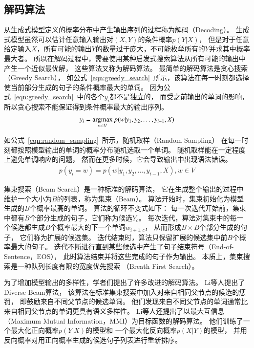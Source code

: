\subsection{解码算法}\label{subsec:decode}
从生成式模型定义的概率分布中产生输出序列的过程称为解码（Decoding）。
生成式模型虽然可以估计任意输入输出对$(X, Y)$的条件概率$p(Y|X)$，
但是对于任意给定输入$X$，所有可能的输出$Y$的数量过于庞大，不可能枚举所有的$Y$并求其中概率最大者。
所以在解码过程中，需要使用某种启发式搜索算法从所有可能的输出中产生一个近似最优解，
这些算法又称为解码算法。
最简单的解码算法是贪心搜索（Greedy Search），
如公式~\ref{eqn:greedy_search}~所示，该算法在每一时刻都选择使当前部分生成的句子的条件概率最大的单词。
因为公式~\ref{eqn:greedy_search}~中的各个$y_i$都不是独立的，
而受之前输出的单词的影响，所以贪心搜索不能保证得到条件概率最大的输出序列。
\begin{align}
    y_i = \operatorname*{argmax}_{w \in V} p(w|y_1, y_2, \dots, y_{i-1}, X)
    \label{eqn:greedy_search}
\end{align}

如公式~\ref{eqn:random_sampling}~所示，随机取样（Random Sampling）
在每一时刻都按照模型输出的单词的概率分布随机选取一个单词。
随机取样能在一定程度上避免单调响应的问题，
然而在更多时候，它会导致输出中出现语法错误。
\begin{align}
    p(y_i = w) = p(w|y_1, y_2, \dots, y_{i-1}, X), w \in V
    \label{eqn:random_sampling}
\end{align}

集束搜索（Beam Search）是一种标准的解码算法，
它在生成整个输出的过程中维护一个大小为$B$的列表，称为集束（Beam）。
算法开始时，集束初始化为模型生成的$B$个概率最高的单词。
算法的循环不变式如下：
每一次迭代开始前，集束中都有$B$个部分生成的句子，它们称为候选$Y_c$。
每次迭代，算法对集束中的每一个候选都生成$B$个概率最大的下一个单词$w_{i+1, c}$，
从而形成$B \times B$个部分生成的句子，
它们称为扩展的候选集。
迭代结束时，算法只保留扩展的候选集中前$B$个概率最大的句子。
迭代不断进行直到某些候选中产生了句子结束符号（End-of-Sentence，EOS），
此时算法结束并将这些完成的句子作为输出。
本质上，集束搜索是一种队列长度有限的宽度优先搜索
（Breath First Search）。

为了增加模型输出的多样性，学者们提出了许多改进的解码算法。
Li等人提出了Diverse Beam算法，
该算法在标准集束搜索中加入对来自相同父节点的候选的惩罚，
即鼓励来自不同父节点的候选单词。
他们发现来自不同父节点的单词通常比来自相同父节点的单词更具有语义多样性。
Li等人还提出了以最大互信息（Maximum Mutual Information，MMI）为目标函数的解码算法。
他们训练了一个最大化正向概率$p(Y|X)$的模型和
一个最大化反向概率$p(X|Y)$的模型，
并用反向概率对用正向概率生成的候选句子列表进行重新排序。

